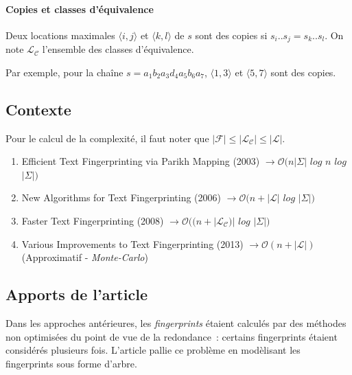 \documentclass[a4paper]{article}
\begin{document}
\paragraph{Copies et classes d'équivalence} Deux locations maximales
$\langle i,j \rangle$ et $\langle k,l \rangle$ de $s$ sont des copies
si $s_{i}..s_{j} = s_{k}..s_{l}$. On note $\mathcal{L}_{\mathcal{C}}$
l'ensemble des classes d'équivalence. \newline

Par exemple, pour la chaîne $s = a_{1} b_{2} a_{3} d_{4} a_{5} b_{6} a_{7}$, $\langle1,3\rangle$ et $\langle5,7\rangle$ sont des copies.

\subsection{Contexte}

Pour le calcul de la complexité, il faut noter que $|\mathcal{F}| \leq |\mathcal{L}_{\mathcal{C}}| \leq |\mathcal{L}|$.

\begin{enumerate}
	\item Efficient Text Fingerprinting via Parikh Mapping (2003) \newline
$\rightarrow \mathcal{O}(n|\Sigma|$ $log$ $n$ $log$ $|\Sigma|)$
	\item New Algorithms for Text Fingerprinting (2006) \newline
$\rightarrow \mathcal{O}(n + |\mathcal{L}|$ $log$ $|\Sigma|)$
	\item Faster Text Fingerprinting (2008) \newline
$\rightarrow \mathcal{O}((n + |\mathcal{L}_{\mathcal{C}})|$ $log$ $|\Sigma|)$
	\item Various Improvements to Text Fingerprinting (2013) \newline
$\rightarrow \mathcal{O}(n + |\mathcal{L}|)$ (Approximatif - \emph{Monte-Carlo})
\end{enumerate}

\subsection{Apports de l'article}

Dans les approches antérieures, les \emph{fingerprints} étaient
calculés par des méthodes non optimisées du point de vue de la
redondance~: certains fingerprints étaient considérés plusieurs
fois. L'article pallie ce problème en modèlisant les fingerprints sous
forme d'arbre.
\end{document}
